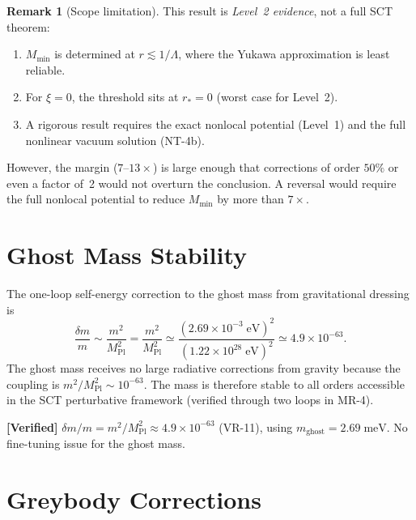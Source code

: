 \documentclass[11pt,a4paper]{article}
\newcommand{\MPl}{M_{\mathrm{Pl}}}
\newcommand{\mghost}{m_{\mathrm{ghost}}}
\theoremstyle{plain}
\theoremstyle{definition}
\newtheorem{remark}[theorem]{Remark}
\newcommand{\verified}[1]{%
  \par\smallskip\noindent
  \colorbox{green!10}{\parbox{\dimexpr\linewidth-2\fboxsep}{%
    \textcolor{green!50!black}{\textbf{[Verified]}} #1}}%
  \par\smallskip}
\begin{document}
\begin{remark}[Scope limitation]
  This result is \emph{Level~2 evidence}, not a full SCT theorem:
  \begin{enumerate}
    \item $M_{\min}$ is determined at $r \lesssim 1/\Lambda$, where the
      Yukawa approximation is least reliable.
    \item For $\xi = 0$, the threshold sits at $r_* = 0$
      (worst case for Level~2).
    \item A rigorous result requires the exact nonlocal potential
      (Level~1) and the full nonlinear vacuum solution (NT-4b).
  \end{enumerate}
  However, the margin ($7$--$13\times$) is large enough that
  corrections of order $50\%$ or even a factor of~2 would not
  overturn the conclusion.  A reversal would require the full
  nonlocal potential to reduce $M_{\min}$ by more than $7\times$.
\end{remark}

\section{Ghost Mass Stability}\label{sec:mass_stability}

The one-loop self-energy correction to the ghost mass from
gravitational dressing is
\begin{equation}\label{eq:delta_m}
  \frac{\delta m}{m}
  \sim \frac{m^2}{\MPl^2}
  = \frac{m^2}{\MPl^2}
  \simeq \frac{(2.69\times 10^{-3}\;\mathrm{eV})^2}
              {(1.22\times 10^{28}\;\mathrm{eV})^2}
  \simeq 4.9\times 10^{-63}.
\end{equation}
The ghost mass receives no large radiative corrections from gravity
because the coupling is $m^2/\MPl^2 \sim 10^{-63}$.  The mass is
therefore stable to all orders accessible in the SCT perturbative
framework (verified through two loops in MR-4).

\verified{$\delta m / m = m^2/\MPl^2 \approx 4.9 \times 10^{-63}$
(VR-11), using $\mghost = 2.69\;\mathrm{meV}$.  No fine-tuning
issue for the ghost mass.}


\section{Greybody Corrections}\label{sec:greybody}
\end{document}
